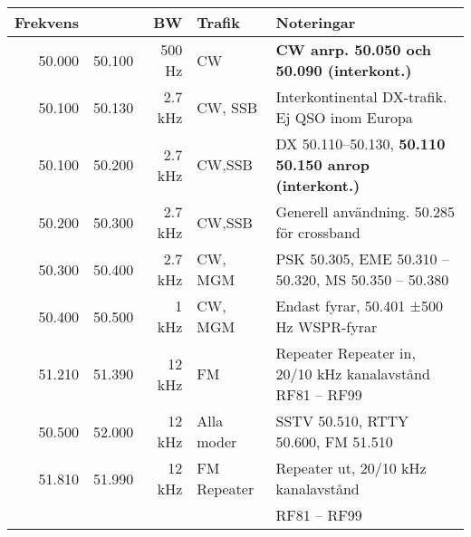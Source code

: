 \begin{tabular}{rrrll}
	\textbf{Frekvens} &        & \textbf{BW} & \textbf{Trafik} & \textbf{Noteringar}                                          \\ \hline
	           50.000 & 50.100 &      500 Hz & CW              & \textbf{CW anrp. 50.050 och 50.090 (interkont.)}             \\ \hline
	           50.100 & 50.130 &     2.7 kHz & CW, SSB         & Interkontinental DX-trafik. Ej QSO inom Europa               \\ \hline
	           50.100 & 50.200 &     2.7 kHz & CW,SSB          & DX 50.110--50.130, \textbf{50.110 50.150 anrop (interkont.)} \\ \hline
	           50.200 & 50.300 &     2.7 kHz & CW,SSB          & Generell användning. 50.285 för crossband                    \\ \hline
	           50.300 & 50.400 &     2.7 kHz & CW, MGM         & PSK 50.305, EME 50.310 – 50.320, MS 50.350 – 50.380          \\ \hline
	           50.400 & 50.500 &       1 kHz & CW, MGM         & Endast fyrar, 50.401 ±500 Hz WSPR-fyrar                      \\ \hline
	           51.210 & 51.390 &      12 kHz & FM              & Repeater Repeater in, 20/10 kHz kanalavstånd RF81 – RF99     \\ \hline
	           50.500 & 52.000 &      12 kHz & Alla moder      & SSTV 50.510, RTTY 50.600, FM 51.510                          \\ \hline
	           51.810 & 51.990 &      12 kHz & FM Repeater     & Repeater ut, 20/10 kHz kanalavstånd                          \\
	                  &        &             &                 & RF81 – RF99                                                  \\ \hline
\end{tabular}

